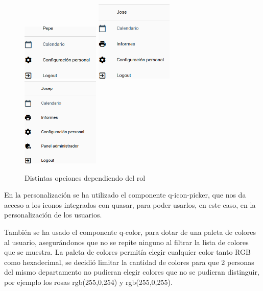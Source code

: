 \documentclass[11pt,spanish,listoffigures,listoftables]{tfgetsinf}
\begin{document}
\begin{figure}[ht!] %
  \includegraphics[width=0.33\textwidth]{img/menubase.png}
  \includegraphics[width=0.33\textwidth]{img/menuresp.png}
  \includegraphics[width=0.33\textwidth]{img/menuadmin.png}
  \caption{Distintas opciones dependiendo del rol}
  \label{fig:menurol}
\end{figure}

En la personalización se ha utilizado el componente q-icon-picker, que nos da acceso a los iconos integrados con quasar, para poder usarlos, en este caso, en la personalización de los usuarios. 

También se ha usado el componente q-color, para dotar de una paleta de colores al usuario, asegurándonos que no se repite ninguno al filtrar la lista de colores que se muestra. 
La paleta de colores permitía elegir cualquier color tanto RGB como hexadecimal, se decidió limitar la cantidad de colores para que 2 personas del mismo departamento no pudieran elegir colores que no se pudieran distinguir, por ejemplo los rosas rgb(255,0,254) y rgb(255,0,255).
\end{document}
